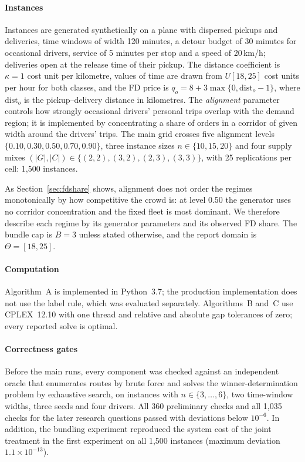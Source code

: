 \documentclass[review,12pt]{elsarticle}
\theoremstyle{definition}
\theoremstyle{remark}
\begin{document}
\paragraph{Instances} Instances are generated synthetically on a plane with
dispersed pickups and deliveries, time windows of width 120 minutes, a
detour budget of 30 minutes for occasional drivers, service of 5 minutes per
stop and a speed of 20\,km/h; deliveries open at the release time of their
pickup. The distance coefficient is $\kappa=1$ cost unit per kilometre,
values of time are drawn from $U[18,25]$ cost units per hour for both
classes, and the FD price is $q_o=8+3\max\{0,\mathrm{dist}_o-1\}$, where
$\mathrm{dist}_o$ is the pickup--delivery distance in kilometres. The
\emph{alignment} parameter controls how strongly occasional drivers'
personal trips overlap with the demand region; it is implemented by
concentrating a share of orders in a corridor of given width around the
drivers' trips. The main grid crosses five alignment levels
$\{0.10,0.30,0.50,0.70,0.90\}$, three instance sizes $n\in\{10,15,20\}$ and
four supply mixes $(|G|,|C|)\in\{(2,2),(3,2),(2,3),(3,3)\}$, with 25
replications per cell: 1,500 instances.

As Section~\ref{sec:fdshare} shows, alignment does not order the regimes
monotonically by how competitive the crowd is: at level 0.50 the generator
uses no corridor concentration and the fixed fleet is most dominant. We
therefore describe each regime by its generator parameters and its observed
FD share. The bundle cap is $B=3$ unless stated otherwise, and the report
domain is $\Theta=[18,25]$.

\paragraph{Computation} Algorithm~A is implemented in Python~3.7; the
production implementation does not use the label rule, which was evaluated
separately. Algorithms~B and~C use CPLEX~12.10 with one thread and relative
and absolute gap tolerances of zero; every reported solve is optimal.

\paragraph{Correctness gates} Before the main runs, every component was
checked against an independent oracle that enumerates routes by brute force
and solves the winner-determination problem by exhaustive search, on
instances with $n\in\{3,\dots,6\}$, two time-window widths, three seeds and
four drivers. All 360 preliminary checks and all 1,035 checks for the later
research questions passed with deviations below $10^{-6}$. In addition, the
bundling experiment reproduced the system cost of the joint treatment in the
first experiment on all 1,500 instances (maximum deviation
$1.1\times10^{-13}$).
\end{document}

